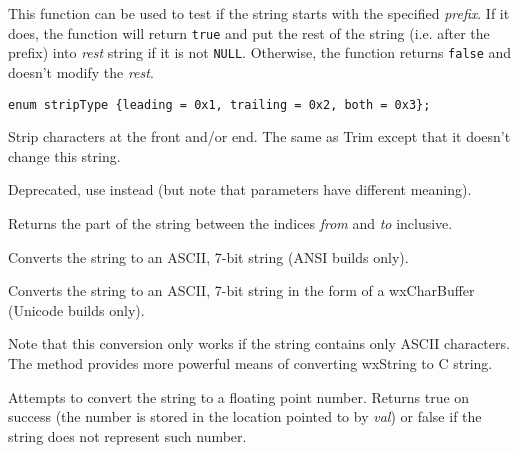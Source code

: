 This function can be used to test if the string starts with the specified 
{\it prefix}. If it does, the function will return {\tt true} and put the rest
of the string (i.e. after the prefix) into {\it rest} string if it is not 
{\tt NULL}. Otherwise, the function returns {\tt false} and doesn't modify the 
{\it rest}.

\label{wxstringstrip}

\begin{verbatim}
enum stripType {leading = 0x1, trailing = 0x2, both = 0x3};
\end{verbatim}


Strip characters at the front and/or end. The same as Trim except that it
doesn't change this string.

\label{wxstringsubstring}


Deprecated, use  instead (but note that parameters
have different meaning).

Returns the part of the string between the indices {\it from} and {\it to}
inclusive.

\label{wxstringtoascii}


Converts the string to an ASCII, 7-bit string (ANSI builds only).


Converts the string to an ASCII, 7-bit string in the form of
a wxCharBuffer (Unicode builds only).

Note that this conversion only works if the string contains only ASCII
characters. The  method provides more
powerful means of converting wxString to C string.

\label{wxstringtodouble}


Attempts to convert the string to a floating point number. Returns true on
success (the number is stored in the location pointed to by {\it val}) or false
if the string does not represent such number.


